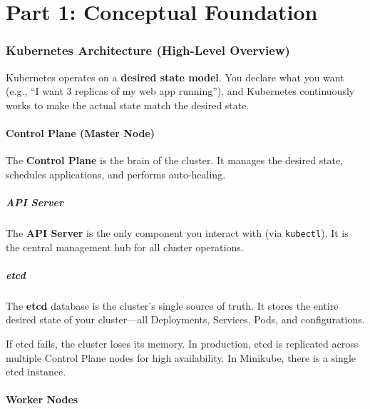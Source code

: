 \documentclass[12pt,a4paper]{article}
\begin{document}
\newpage

\part{Part 1: Conceptual Foundation}

\section{Kubernetes Architecture (High-Level Overview)}

Kubernetes operates on a \textbf{desired state model}. You declare what you want (e.g., ``I want 3 replicas of my web app running''), and Kubernetes continuously works to make the actual state match the desired state.

\subsection{Control Plane (Master Node)}

The \textbf{Control Plane} is the brain of the cluster. It manages the desired state, schedules applications, and performs auto-healing.

\subsubsection{API Server}

The \textbf{API Server} is the only component you interact with (via \texttt{kubectl}). It is the central management hub for all cluster operations.

\subsubsection{etcd}

The \textbf{etcd} database is the cluster's single source of truth. It stores the entire desired state of your cluster—all Deployments, Services, Pods, and configurations.

\begin{importantbox}
If etcd fails, the cluster loses its memory. In production, etcd is replicated across multiple Control Plane nodes for high availability. In Minikube, there is a single etcd instance.
\end{importantbox}

\subsection{Worker Nodes}
\end{document}
